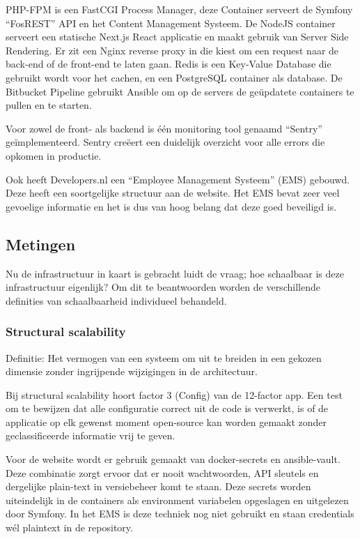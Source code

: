 PHP-FPM is een FastCGI Process Manager, deze Container serveert de Symfony “FosREST” API en het Content Management Systeem. De NodeJS container serveert een statische Next.js React applicatie en maakt gebruik van Server Side Rendering. Er zit een Nginx reverse proxy in die kiest om een request naar de back-end of de front-end te laten gaan. Redis is een Key-Value Database die gebruikt wordt voor het cachen, en een PostgreSQL container als database. De Bitbucket Pipeline gebruikt Ansible om op de servers de geüpdatete containers te pullen en te starten.

Voor zowel de front- als backend is één monitoring tool genaamd \enquote{Sentry} geïmplementeerd. Sentry creëert een duidelijk overzicht voor alle errors die opkomen in productie.

Ook heeft Developers.nl een \enquote{Employee Management Systeem} (EMS) gebouwd. Deze heeft een soortgelijke structuur aan de website. Het EMS bevat zeer veel gevoelige informatie en het is dus van hoog belang dat deze goed beveiligd is.

\subsection{Metingen}

Nu de infrastructuur in kaart is gebracht luidt de vraag; hoe schaalbaar is deze infrastructuur eigenlijk? Om dit te beantwoorden worden de verschillende definities van schaalbaarheid individueel behandeld.

\subsubsection{Structural scalability}
Definitie: Het vermogen van een systeem om uit te breiden in een gekozen dimensie zonder ingrijpende wijzigingen in de architectuur.

Bij structural scalability hoort factor 3 (Config) van de 12-factor app. Een test om te bewijzen dat alle configuratie correct uit de code is verwerkt, is of de applicatie op elk gewenst moment open-source kan worden gemaakt zonder geclassificeerde informatie vrij te geven.

Voor de website wordt er gebruik gemaakt van docker-secrets en ansible-vault. Deze combinatie zorgt ervoor dat er nooit wachtwoorden, API sleutels en dergelijke plain-text in versiebeheer komt te staan. Deze secrets worden uiteindelijk in de containers als environment variabelen opgeslagen en uitgelezen door Symfony. In het EMS is deze techniek nog niet gebruikt en staan credentials wél plaintext in de repository.


